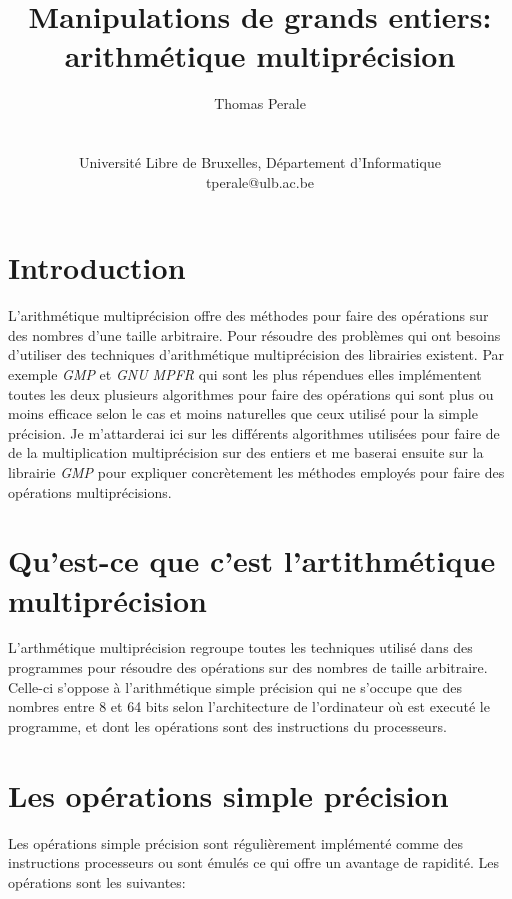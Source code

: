 \documentclass[letterpaper]{article}
\title{Manipulations de grands entiers: arithmétique multiprécision}
\author{Thomas Perale\\
    \mbox{}\\\\
    Université Libre de Bruxelles, Département d'Informatique\\
    tperale@ulb.ac.be\\
}
\begin{document}
\maketitle

\begin{abstract}

\end{abstract}

\section{Introduction}

L'arithmétique multiprécision offre des méthodes pour faire des opérations sur
des nombres d'une taille arbitraire. Pour résoudre des problèmes qui ont
besoins d'utiliser des techniques d'arithmétique multiprécision des librairies
existent. Par exemple \emph{GMP} et \emph{GNU MPFR} qui sont les plus
répendues elles implémentent toutes les deux plusieurs algorithmes pour faire
des opérations qui sont plus ou moins efficace selon le cas et moins naturelles
que ceux utilisé pour la simple précision.
Je m'attarderai ici sur les différents algorithmes utilisées pour faire de
de la multiplication multiprécision sur des entiers et me baserai ensuite sur
la librairie \emph{GMP} pour expliquer concrètement les méthodes employés pour
faire des opérations multiprécisions.

\section{Qu'est-ce que c'est l'artithmétique multiprécision}

L'arthmétique multiprécision regroupe toutes les techniques utilisé dans des
programmes pour résoudre des opérations sur des nombres de taille
arbitraire\cite{wikimultiprecision}.
Celle-ci s'oppose à l'arithmétique simple précision qui ne s'occupe que des
nombres entre 8 et 64 bits selon l'architecture de l'ordinateur où est executé
le programme, et dont les opérations sont des instructions du
processeurs\cite{wikimultiprecision}.

\section{Les opérations simple précision}

Les opérations simple précision sont régulièrement implémenté comme des
instructions processeurs ou sont émulés ce qui offre un avantage de rapidité.
Les opérations sont les suivantes\cite{wikialu}:
\end{document}
